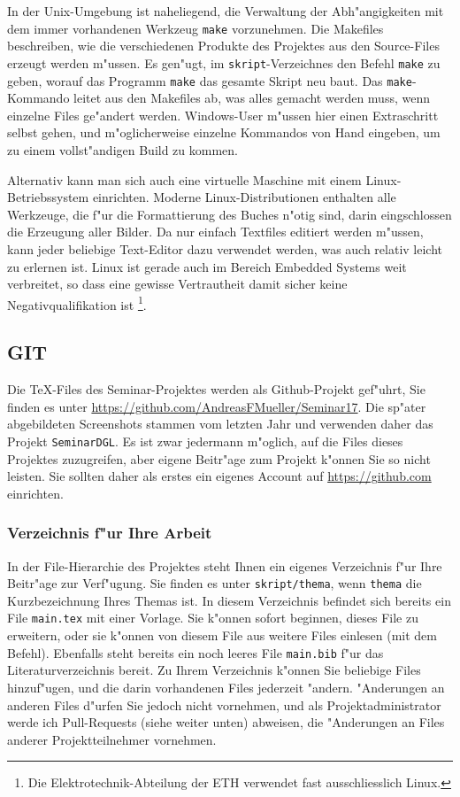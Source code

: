 \documentclass[a4paper,12pt]{article}
\begin{document}
In der Unix-Umgebung ist naheliegend, die Verwaltung der Abh"angigkeiten
mit dem immer vorhandenen Werkzeug \texttt{make} vorzunehmen.
Die Makefiles beschreiben, wie die verschiedenen Produkte des Projektes
aus den Source-Files erzeugt werden m"ussen.
Es gen"ugt, im \texttt{skript}-Verzeichnes den Befehl \texttt{make} zu geben, 
worauf das Programm \texttt{make} das gesamte Skript neu baut.
Das \texttt{make}-Kommando leitet aus den Makefiles ab, was alles gemacht
werden muss, wenn einzelne Files ge"andert werden.
Windows-User m"ussen hier einen Extraschritt selbst gehen, und m"oglicherweise
einzelne Kommandos von Hand eingeben, um zu einem vollst"andigen Build
zu kommen.

Alternativ kann man sich auch eine virtuelle Maschine mit einem
Linux-Betriebssystem einrichten.
Moderne Linux-Distributionen enthalten alle Werkzeuge, die f"ur die
Formattierung des Buches n"otig sind, darin eingschlossen die
Erzeugung aller Bilder.
Da nur einfach Textfiles editiert werden m"ussen, kann jeder beliebige
Text-Editor dazu verwendet werden, was auch relativ leicht zu erlernen ist.
Linux ist gerade auch im Bereich Embedded Systems weit verbreitet, so
dass eine gewisse Vertrautheit damit sicher keine Negativqualifikation ist%
\footnote{Die Elektrotechnik-Abteilung der ETH verwendet fast ausschliesslich
Linux.}.

\subsection{GIT}
Die \TeX-Files des Seminar-Projektes werden als Github-Projekt gef"uhrt,
Sie finden es unter \url{https://github.com/AndreasFMueller/Seminar17}.
Die sp"ater abgebildeten Screenshots stammen vom letzten Jahr und
verwenden daher das Projekt \verb+SeminarDGL+.
Es ist zwar jedermann m"oglich, auf die Files dieses Projektes zuzugreifen,
aber eigene Beitr"age zum Projekt k"onnen Sie so nicht leisten.
Sie sollten daher als erstes ein eigenes Account auf \url{https://github.com}
einrichten.

\subsubsection{Verzeichnis f"ur Ihre Arbeit}
In der File-Hierarchie des Projektes steht Ihnen ein eigenes Verzeichnis
f"ur Ihre Beitr"age zur Verf"ugung.
Sie finden es unter \texttt{skript/thema}, wenn \texttt{thema}
die Kurzbezeichnung Ihres Themas ist.
In diesem Verzeichnis befindet sich bereits ein File \texttt{main.tex}
mit einer Vorlage.
Sie k"onnen sofort beginnen, dieses File zu erweitern, oder sie k"onnen
von diesem File aus weitere Files einlesen (mit dem \verb++
Befehl).
Ebenfalls steht bereits ein noch leeres File \texttt{main.bib} f"ur
das Literaturverzeichnis bereit.
Zu Ihrem Verzeichnis k"onnen Sie beliebige Files hinzuf"ugen, und
die darin vorhandenen Files jederzeit "andern.
"Anderungen an anderen Files d"urfen Sie jedoch nicht vornehmen, und als
Projektadministrator werde ich Pull-Requests (siehe weiter unten)
abweisen, die "Anderungen an Files anderer Projektteilnehmer vornehmen.
\end{document}
